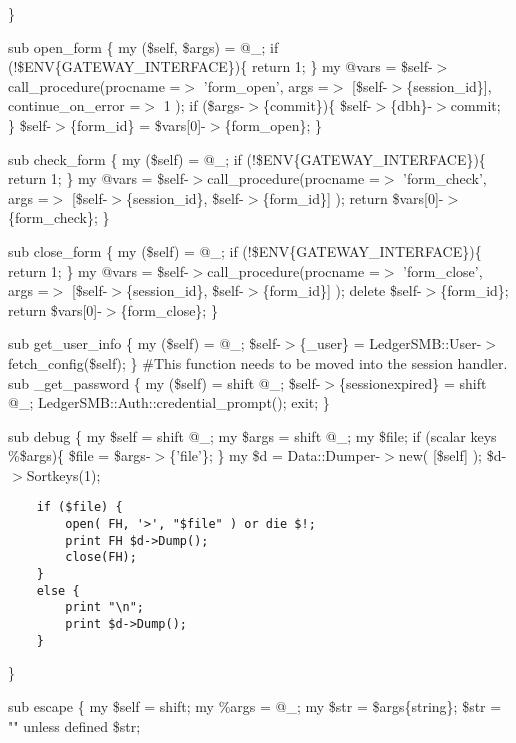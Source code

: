 \}



sub open\_form \{
    my (\$self, \$args) = @\_;
    if (!\$ENV\{GATEWAY\_INTERFACE\})\{
        return 1;
    \}
    my @vars = \$self-$>$call\_procedure(procname =$>$ 'form\_open', 
                              args =$>$ [\$self-$>$\{session\_id\}],
                              continue\_on\_error =$>$ 1
    );
    if (\$args-$>$\{commit\})\{
       \$self-$>$\{dbh\}-$>$commit;
    \}
    \$self-$>$\{form\_id\} = \$vars[0]-$>$\{form\_open\};
\}



sub check\_form \{
    my (\$self) = @\_;
    if (!\$ENV\{GATEWAY\_INTERFACE\})\{
        return 1;
    \}
    my @vars = \$self-$>$call\_procedure(procname =$>$ 'form\_check', 
                              args =$>$ [\$self-$>$\{session\_id\}, \$self-$>$\{form\_id\}]
    );
    return \$vars[0]-$>$\{form\_check\};
\}



sub close\_form \{
    my (\$self) = @\_;
    if (!\$ENV\{GATEWAY\_INTERFACE\})\{
        return 1;
    \}
    my @vars = \$self-$>$call\_procedure(procname =$>$ 'form\_close', 
                              args =$>$ [\$self-$>$\{session\_id\}, \$self-$>$\{form\_id\}]
    );
    delete \$self-$>$\{form\_id\};
    return \$vars[0]-$>$\{form\_close\};
\}



sub get\_user\_info \{
    my (\$self) = @\_;
    \$self-$>$\{\_user\} = LedgerSMB::User-$>$fetch\_config(\$self);
\}
\#This function needs to be moved into the session handler.
sub \_get\_password \{
    my (\$self) = shift @\_;
    \$self-$>$\{sessionexpired\} = shift @\_;
    LedgerSMB::Auth::credential\_prompt();
    exit;
\}



sub debug \{
    my \$self = shift @\_;
    my \$args = shift @\_;
    my \$file;
    if (scalar keys \%\$args)\{
        \$file = \$args-$>$\{'file'\};
    \}
    my \$d    = Data::Dumper-$>$new( [\$self] );
    \$d-$>$Sortkeys(1);

\begin{verbatim}
    if ($file) {
        open( FH, '>', "$file" ) or die $!;
        print FH $d->Dump();
        close(FH);
    }
    else {
        print "\n";
        print $d->Dump();
    }
\end{verbatim}


\}



sub escape \{
    my \$self = shift;
    my \%args = @\_;
    my \$str  = \$args\{string\};
    \$str = "" unless defined \$str;

